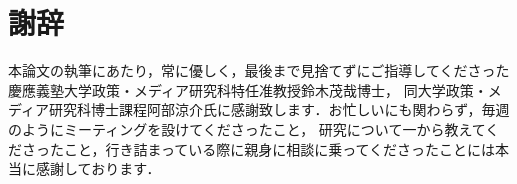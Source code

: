 \chapter*{謝辞}
\label{thanks}

本論文の執筆にあたり，常に優しく，最後まで見捨てずにご指導してくださった慶應義塾大学政策・メディア研究科特任准教授鈴木茂哉博士，
同大学政策・メディア研究科博士課程阿部涼介氏に感謝致します．お忙しいにも関わらず，毎週のようにミーティングを設けてくださったこと，
研究について一から教えてくださったこと，行き詰まっている際に親身に相談に乗ってくださったことには本当に感謝しております．

